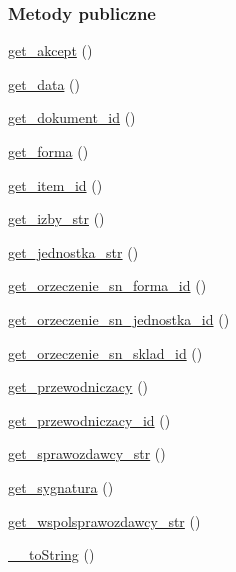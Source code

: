 \subsubsection*{Metody publiczne}
\begin{DoxyCompactItemize}
\item 
\hyperlink{classep___s_n___orzeczenie_a76d66bf9d593a034ae91951dcfb8596c}{get\-\_\-akcept} ()
\item 
\hyperlink{classep___s_n___orzeczenie_ab5976d1ba325a739761c2eb6662f58a9}{get\-\_\-data} ()
\item 
\hyperlink{classep___s_n___orzeczenie_adc3366b534d8e1e2570fd6a80624d7ed}{get\-\_\-dokument\-\_\-id} ()
\item 
\hyperlink{classep___s_n___orzeczenie_a1bddc6deeff779552edc10c439053c9f}{get\-\_\-forma} ()
\item 
\hyperlink{classep___s_n___orzeczenie_a4e3ee9b67d81c24fd49cc82ba5116a57}{get\-\_\-item\-\_\-id} ()
\item 
\hyperlink{classep___s_n___orzeczenie_ab3f6033539ec592f4639edf8c7561d1e}{get\-\_\-izby\-\_\-str} ()
\item 
\hyperlink{classep___s_n___orzeczenie_ad3ab86985bf3688c5de5a95d718de03c}{get\-\_\-jednostka\-\_\-str} ()
\item 
\hyperlink{classep___s_n___orzeczenie_af3ab4f45cfd59bc09d5f8154bb58d1d9}{get\-\_\-orzeczenie\-\_\-sn\-\_\-forma\-\_\-id} ()
\item 
\hyperlink{classep___s_n___orzeczenie_a4fa6a41af1aa00c454ba78a56b557539}{get\-\_\-orzeczenie\-\_\-sn\-\_\-jednostka\-\_\-id} ()
\item 
\hyperlink{classep___s_n___orzeczenie_ab5cb075dc2818876714bc49a8181543f}{get\-\_\-orzeczenie\-\_\-sn\-\_\-sklad\-\_\-id} ()
\item 
\hyperlink{classep___s_n___orzeczenie_a66121e5b485d83675a1e0dfeec8d0fd4}{get\-\_\-przewodniczacy} ()
\item 
\hyperlink{classep___s_n___orzeczenie_a7351666042a6cbd5f6af727ef06e24fb}{get\-\_\-przewodniczacy\-\_\-id} ()
\item 
\hyperlink{classep___s_n___orzeczenie_a7c1260a14404fc48a9aa5da636909e71}{get\-\_\-sprawozdawcy\-\_\-str} ()
\item 
\hyperlink{classep___s_n___orzeczenie_a2816085ef7f03472a9c8aaf65df2d6d5}{get\-\_\-sygnatura} ()
\item 
\hyperlink{classep___s_n___orzeczenie_a0853d84cd54c6da9b292b3be3b53d919}{get\-\_\-wspolsprawozdawcy\-\_\-str} ()
\item 
\hyperlink{classep___s_n___orzeczenie_a7516ca30af0db3cdbf9a7739b48ce91d}{\-\_\-\-\_\-to\-String} ()

\end{DoxyCompactItemize}
